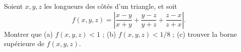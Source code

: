 Soient $x, y, z$ les longueurs des côtés d'un triangle, et soit
\[ f(x, y, z) = \left|\frac{x - y}{x + y} + \frac{y - z}{y + z} + \frac{z - x}{z + x}\right|. \]
Montrer que (a) $f(x, y, z) < 1$ ; (b) $f(x, y, z) < 1/8$ ; (c) trouver la borne supérieure de $f(x, y, z)$.
